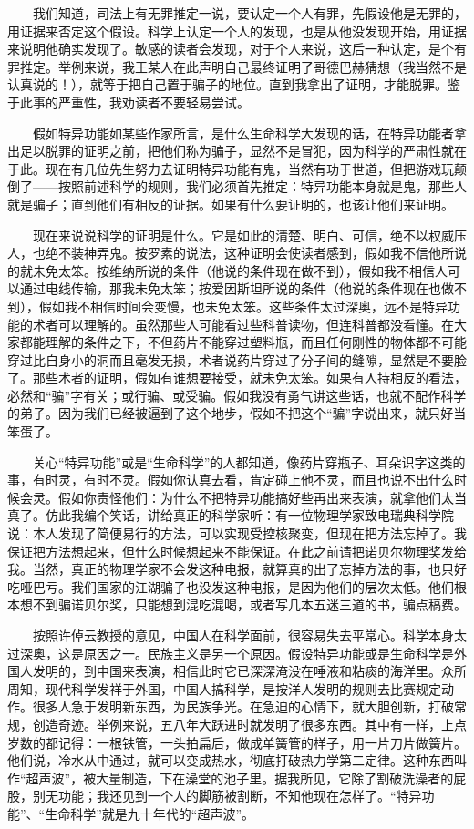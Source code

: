 　　我们知道，司法上有无罪推定一说，要认定一个人有罪，先假设他是无罪的，用证据来否定这个假设。科学上认定一个人的发现，也是从他没发现开始，用证据来说明他确实发现了。敏感的读者会发现，对于个人来说，这后一种认定，是个有罪推定。举例来说，我王某人在此声明自己最终证明了哥德巴赫猜想（我当然不是认真说的！），就等于把自己置于骗子的地位。直到我拿出了证明，才能脱罪。鉴于此事的严重性，我劝读者不要轻易尝试。 

　　假如特异功能如某些作家所言，是什么生命科学大发现的话，在特异功能者拿出足以脱罪的证明之前，把他们称为骗子，显然不是冒犯，因为科学的严肃性就在于此。现在有几位先生努力去证明特异功能有鬼，当然有功于世道，但把游戏玩颠倒了——按照前述科学的规则，我们必须首先推定：特异功能本身就是鬼，那些人就是骗子；直到他们有相反的证据。如果有什么要证明的，也该让他们来证明。 

　　现在来说说科学的证明是什么。它是如此的清楚、明白、可信，绝不以权威压人，也绝不装神弄鬼。按罗素的说法，这种证明会使读者感到，假如我不信他所说的就未免太笨。按维纳所说的条件（他说的条件现在做不到），假如我不相信人可以通过电线传输，那我未免太笨；按爱因斯坦所说的条件（他说的条件现在也做不到），假如我不相信时间会变慢，也未免太笨。这些条件太过深奥，远不是特异功能的术者可以理解的。虽然那些人可能看过些科普读物，但连科普都没看懂。在大家都能理解的条件之下，不但药片不能穿过塑料瓶，而且任何刚性的物体都不可能穿过比自身小的洞而且毫发无损，术者说药片穿过了分子间的缝隙，显然是不要脸了。那些术者的证明，假如有谁想要接受，就未免太笨。如果有人持相反的看法，必然和“骗”字有关；或行骗、或受骗。假如我没有勇气讲这些话，也就不配作科学的弟子。因为我们已经被逼到了这个地步，假如不把这个“骗”字说出来，就只好当笨蛋了。 

　　关心“特异功能”或是“生命科学”的人都知道，像药片穿瓶子、耳朵识字这类的事，有时灵，有时不灵。假如你认真去看，肯定碰上他不灵，而且也说不出什么时候会灵。假如你责怪他们：为什么不把特异功能搞好些再出来表演，就拿他们太当真了。仿此我编个笑话，讲给真正的科学家听：有一位物理学家致电瑞典科学院说：本人发现了简便易行的方法，可以实现受控核聚变，但现在把方法忘掉了。我保证把方法想起来，但什么时候想起来不能保证。在此之前请把诺贝尔物理奖发给我。当然，真正的物理学家不会发这种电报，就算真的出了忘掉方法的事，也只好吃哑巴亏。我们国家的江湖骗子也没发这种电报，是因为他们的层次太低。他们根本想不到骗诺贝尔奖，只能想到混吃混喝，或者写几本五迷三道的书，骗点稿费。 

　　按照许倬云教授的意见，中国人在科学面前，很容易失去平常心。科学本身太过深奥，这是原因之一。民族主义是另一个原因。假设特异功能或是生命科学是外国人发明的，到中国来表演，相信此时它已深深淹没在唾液和粘痰的海洋里。众所周知，现代科学发祥于外国，中国人搞科学，是按洋人发明的规则去比赛规定动作。很多人急于发明新东西，为民族争光。在急迫的心情下，就大胆创新，打破常规，创造奇迹。举例来说，五八年大跃进时就发明了很多东西。其中有一样，上点岁数的都记得：一根铁管，一头拍扁后，做成单簧管的样子，用一片刀片做簧片。他们说，冷水从中通过，就可以变成热水，彻底打破热力学第二定律。这种东西叫作“超声波”，被大量制造，下在澡堂的池子里。据我所见，它除了割破洗澡者的屁股，别无功能；我还见到一个人的脚筋被割断，不知他现在怎样了。“特异功能”、“生命科学”就是九十年代的“超声波”。 


